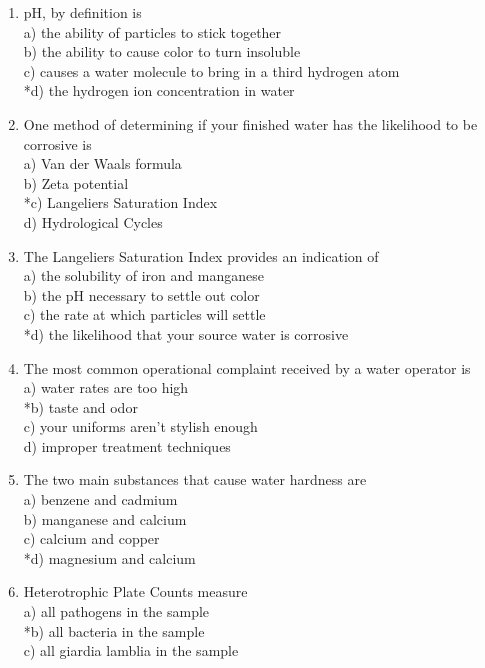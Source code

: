 \begin{enumerate}[1.]
   \item pH, by definition is\\
a) the ability of particles to stick together\\
b) the ability to cause color to turn insoluble\\
c) causes a water molecule to bring in a third hydrogen atom\\
*d) the hydrogen ion concentration in water\\
  \item One method of determining if your finished water has the likelihood to be corrosive is\\
a) Van der Waals formula\\
b) Zeta potential\\
*c) Langeliers Saturation Index\\
d) Hydrological Cycles\\
  \item The Langeliers Saturation Index provides an indication of\\
a) the solubility of iron and manganese\\
b) the $\mathrm{pH}$ necessary to settle out color\\
c) the rate at which particles will settle\\
*d) the likelihood that your source water is corrosive\\
 \item The most common operational complaint received by a water operator is\\
a) water rates are too high\\
*b) taste and odor\\
c) your uniforms aren't stylish enough\\
d) improper treatment techniques\\
  \item The two main substances that cause water hardness are\\
a) benzene and cadmium\\
b) manganese and calcium\\
c) calcium and copper\\
*d) magnesium and calcium\\
  \item Heterotrophic Plate Counts measure\\
a) all pathogens in the sample\\
*b) all bacteria in the sample\\
c) all giardia lamblia in the sample\\

\end{enumerate}
